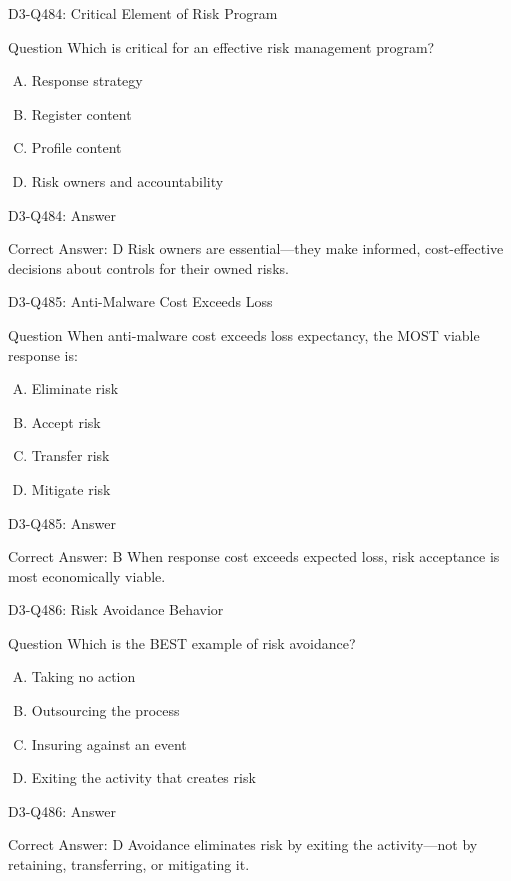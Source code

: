 \documentclass{beamer}
\begin{document}
\begin{frame}{D3-Q484: Critical Element of Risk Program}
	\begin{block}{Question}
		Which is critical for an effective risk management program?
	\end{block}
	\begin{enumerate}[(A)]
		\item Response strategy
		\item Register content
		\item Profile content
		\item Risk owners and accountability
	\end{enumerate}
\end{frame}
\begin{frame}{D3-Q484: Answer}
	\begin{block}{Correct Answer: D}
		Risk owners are essential—they make informed, cost-effective decisions about controls for their owned risks.
	\end{block}
\end{frame}

\begin{frame}{D3-Q485: Anti-Malware Cost Exceeds Loss}
	\begin{block}{Question}
		When anti-malware cost exceeds loss expectancy, the MOST viable response is:
	\end{block}
	\begin{enumerate}[(A)]
		\item Eliminate risk
		\item Accept risk
		\item Transfer risk
		\item Mitigate risk
	\end{enumerate}
\end{frame}
\begin{frame}{D3-Q485: Answer}
	\begin{block}{Correct Answer: B}
		When response cost exceeds expected loss, risk acceptance is most economically viable.
	\end{block}
\end{frame}

\begin{frame}{D3-Q486: Risk Avoidance Behavior}
	\begin{block}{Question}
		Which is the BEST example of risk avoidance?
	\end{block}
	\begin{enumerate}[(A)]
		\item Taking no action
		\item Outsourcing the process
		\item Insuring against an event
		\item Exiting the activity that creates risk
	\end{enumerate}
\end{frame}
\begin{frame}{D3-Q486: Answer}
	\begin{block}{Correct Answer: D}
		Avoidance eliminates risk by exiting the activity—not by retaining, transferring, or mitigating it.
	\end{block}
\end{frame}
\end{document}

